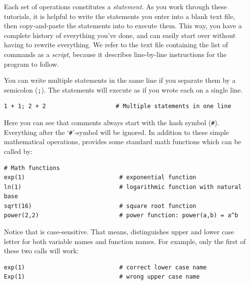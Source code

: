 Each set of operations constitutes a \emph{statement}.
As you work through these tutorials, it is helpful to write the statements you enter into a blank text file, then copy-and-paste the statements into \Rev to execute them.
This way, you have a complete history of everything you've done, and can easily start over without having to rewrite everything.
We refer to the text file containing the list of commands as a \emph{script}, because it describes line-by-line instructions for the program to follow.

You can write multiple statements in the same line if you separate them by a semicolon (\texttt{;}).
The statements will execute as if you wrote each on a single line.
{\tt \begin{snugshade*}
\begin{lstlisting}    
1 + 1; 2 + 2                    # Multiple statements in one line
\end{lstlisting}
\end{snugshade*}}

Here you can see that comments always start with the hash symbol (\texttt{\#}).
Everything after the `\texttt{\#}'-symbol will be ignored.
In addition to these simple mathematical operations, \Rev provides some standard math functions which can be called by:
{\tt \begin{snugshade*}
\begin{lstlisting}    
# Math functions
exp(1)                           # exponential function
ln(1)                            # logarithmic function with natural base
sqrt(16)                         # square root function 
power(2,2)                       # power function: power(a,b) = a^b
\end{lstlisting}
\end{snugshade*}}
Notice that \Rev is case-sensitive.
That means, \Rev distinguishes upper and lower case letter for both variable names and function names.
For example, only the first of these two calls will work:
{\tt \begin{snugshade*}
\begin{lstlisting}    
exp(1)                           # correct lower case name
Exp(1)                           # wrong upper case name
\end{lstlisting}
\end{snugshade*}}

\clearpage
